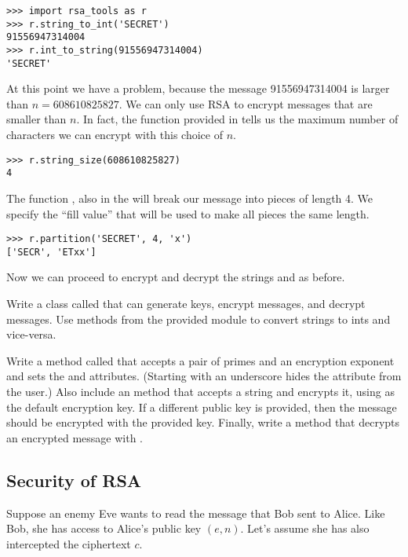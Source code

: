 \begin{lstlisting}
>>> import rsa_tools as r
>>> r.string_to_int('SECRET')
91556947314004
>>> r.int_to_string(91556947314004)
'SECRET'
\end{lstlisting}

At this point we have a problem, because the message 91556947314004 is larger than $n=608610825827$.
We can only use RSA to encrypt messages that are smaller than $n$.
In fact, the function  provided in  tells us the maximum number of characters we can encrypt with this choice of $n$.

\begin{lstlisting}
>>> r.string_size(608610825827)
4
\end{lstlisting}

The function , also in the  will break our message into pieces of length 4.
We specify the ``fill value''  that will be used to make all pieces the same length.

\begin{lstlisting}
>>> r.partition('SECRET', 4, 'x')
['SECR', 'ETxx']
\end{lstlisting}
Now we can proceed to encrypt and decrypt the strings  and  as before.

\begin{problem}
Write a class called  that can generate keys, encrypt messages, and decrypt messages.
Use methods from the provided  module to convert strings to ints and vice-versa.

Write a method called  that accepts a pair of primes and an encryption exponent and sets the  and  attributes.
(Starting  with an underscore hides the attribute from the user.)
Also include an  method that accepts a string and encrypts it, using  as the default encryption key.
If a different public key is provided, then the message should be encrypted with the provided key.
Finally, write a  method that decrypts an encrypted message with .
\label{prob:rsa1}
\end{problem}

\subsection*{Security of RSA}
Suppose an enemy Eve wants to read the message that Bob sent to Alice.
Like Bob, she has access to Alice's public key $(e, n)$.
Let's assume she has also intercepted the ciphertext $c$.

